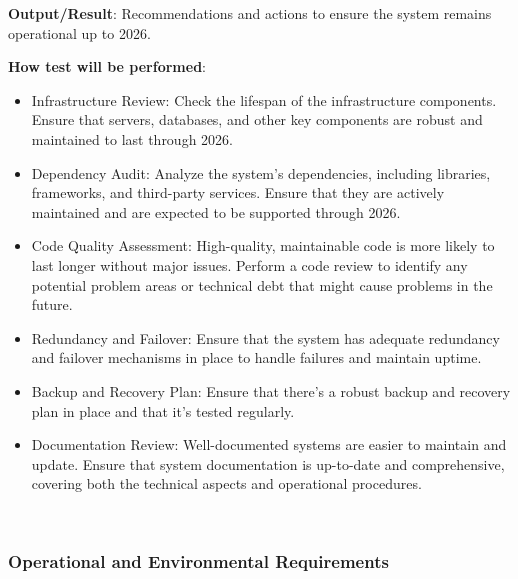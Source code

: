 \documentclass[12pt, titlepage]{article}
\begin{document}
\begin{enumerate}
\textbf{Output/Result}: Recommendations and actions to ensure the system remains operational up to 2026.

\textbf{How test will be performed}: 
\begin{itemize}[noitemsep]
    \item Infrastructure Review: Check the lifespan of the infrastructure components. Ensure that servers, databases, and other key components are robust and maintained to last through 2026.
    \item Dependency Audit: Analyze the system's dependencies, including libraries, frameworks, and third-party services. Ensure that they are actively maintained and are expected to be supported through 2026.
    \item Code Quality Assessment: High-quality, maintainable code is more likely to last longer without major issues. Perform a code review to identify any potential problem areas or technical debt that might cause problems in the future.
    \item Redundancy and Failover: Ensure that the system has adequate redundancy and failover mechanisms in place to handle failures and maintain uptime.
    \item Backup and Recovery Plan: Ensure that there's a robust backup and recovery plan in place and that it's tested regularly.
    \item Documentation Review: Well-documented systems are easier to maintain and update. Ensure that system documentation is up-to-date and comprehensive, covering both the technical aspects and operational procedures.
\end{itemize}\\

\end{enumerate}


\subsubsection{Operational and Environmental Requirements}
\end{document}
